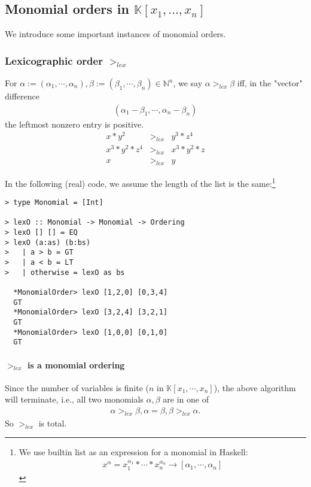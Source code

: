 \documentclass[11pt]{book}
\begin{document}
\subsection{Monomial orders in $\mathbb{K}[x_1, ... , x_n]$}
\label{MonomialOrders}
We introduce some important instances of monomial orders.

\subsubsection{Lexicographic order $>_{lex}$}
For $\alpha := (\alpha_1, \cdots, \alpha_n), \beta := (\beta_1, \cdots, \beta_n) \in \mathbb{N}^n$, we say $\alpha >_{lex} \beta$ iff, in the "vector" difference
\begin{eqnarray}
(\alpha_1- \beta_1, \cdots, \alpha_n -\beta_n)
\end{eqnarray}
the leftmost nonzero entry is positive.
\begin{eqnarray}
x * y^2 &>_{lex}& y^3 * z^4 \\
x^3 * y^2 * z^4 &>_{lex}& x^3 * y^2 * z \\
x &>_{lex}& y
\end{eqnarray}

In the following (real) code, we assume the length of the list is the same:\footnote{
We use builtin list as an expression for a monomial in Haskell:
\begin{eqnarray}
x^\alpha = x_1^{\alpha_1} * \cdots * x_n^{\alpha_n} \to [\alpha_1, \cdots, \alpha_n]
\end{eqnarray}
}

\begin{verbatim}
> type Monomial = [Int]

> lexO :: Monomial -> Monomial -> Ordering
> lexO [] [] = EQ
> lexO (a:as) (b:bs)
>   | a > b = GT
>   | a < b = LT
>   | otherwise = lexO as bs

  *MonomialOrder> lexO [1,2,0] [0,3,4]
  GT
  *MonomialOrder> lexO [3,2,4] [3,2,1]
  GT
  *MonomialOrder> lexO [1,0,0] [0,1,0]
  GT
\end{verbatim}

\paragraph{$>_{lex}$ is a monomial ordering}
Since the number of variables is finite ($n$ in $\mathbb{K}[x_1, \cdots, x_n]$), the above algorithm will terminate, i.e., all two monomials $\alpha, \beta$ are in one of
\begin{eqnarray}
\alpha >_{lex} \beta, \alpha = \beta, \beta >_{lex} \alpha.
\end{eqnarray}
So $>_{lex}$ is total.
\end{document}
